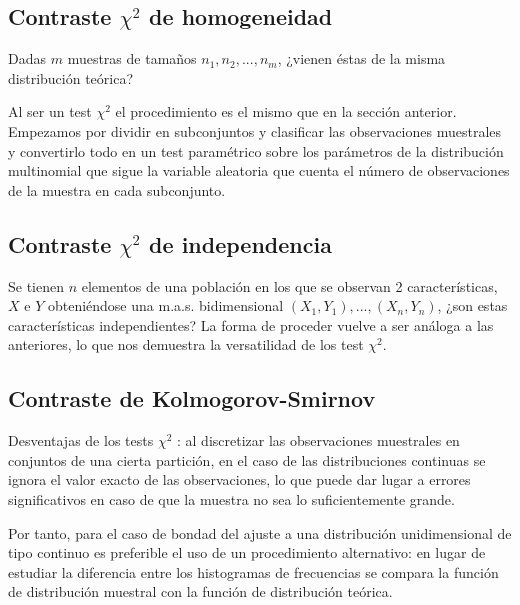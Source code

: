 \documentclass[a4paper,12pt]{article}
\begin{document}
\subsection{Contraste $\chi^2$ de homogeneidad}
Dadas $m$ muestras de tamaños $n_1, n_2,...,n_m$, ¿vienen éstas de la misma distribución teórica?


Al ser un test $\chi ^2$ el procedimiento es el mismo que en la sección anterior. Empezamos por dividir en subconjuntos y clasificar las observaciones muestrales y convertirlo todo en un test paramétrico sobre los parámetros de la distribución multinomial que sigue la variable aleatoria que cuenta el número de observaciones de la muestra en cada subconjunto. 
\subsection{Contraste $\chi^2$ de independencia}
Se tienen $n$ elementos de una población en los que se observan 2 características, $X$ e $Y$ obteniéndose una m.a.s. bidimensional $(X_1,Y_1),...,(X_n,Y_n)$, ¿son estas características independientes? La forma de proceder vuelve a ser análoga a las anteriores, lo que nos demuestra la versatilidad de los test $\chi^2$.

\subsection{Contraste de Kolmogorov-Smirnov }
Desventajas de los tests $\chi^2$ : al discretizar las observaciones muestrales en conjuntos de una cierta partición, en el caso de las distribuciones continuas se ignora el valor exacto de las observaciones, lo que puede dar lugar a errores significativos en caso de que la muestra no sea lo suficientemente grande.

Por tanto, para el caso de bondad del ajuste a una distribución unidimensional de tipo continuo es preferible el uso de un procedimiento alternativo: en lugar de estudiar la diferencia entre los histogramas de frecuencias se compara la función de distribución muestral con la función de distribución teórica.
\end{document}
